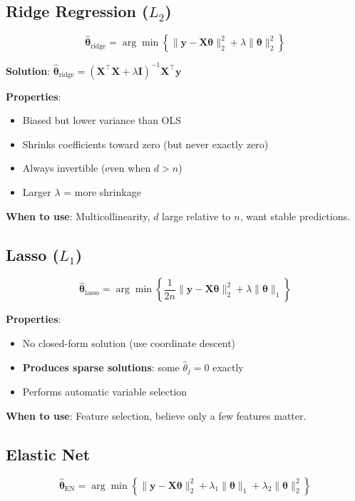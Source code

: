 \documentclass[main.tex]{subfiles}
\begin{document}
\subsection{Ridge Regression ($L_2$)}

$$\hat{\boldsymbol{\theta}}_{\text{ridge}} = \arg\min \left\{ \|\mathbf{y} - \mathbf{X}\boldsymbol{\theta}\|_2^2 + \lambda\|\boldsymbol{\theta}\|_2^2 \right\}$$

\textbf{Solution}: $\hat{\boldsymbol{\theta}}_{\text{ridge}} = (\mathbf{X}^\top\mathbf{X} + \lambda\mathbf{I})^{-1}\mathbf{X}^\top\mathbf{y}$

\textbf{Properties}:
\begin{itemize}
    \item Biased but lower variance than OLS
    \item Shrinks coefficients toward zero (but never exactly zero)
    \item Always invertible (even when $d > n$)
    \item Larger $\lambda$ = more shrinkage
\end{itemize}

\textbf{When to use}: Multicollinearity, $d$ large relative to $n$, want stable predictions.

\subsection{Lasso ($L_1$)}

$$\hat{\boldsymbol{\theta}}_{\text{lasso}} = \arg\min \left\{ \frac{1}{2n}\|\mathbf{y} - \mathbf{X}\boldsymbol{\theta}\|_2^2 + \lambda\|\boldsymbol{\theta}\|_1 \right\}$$

\textbf{Properties}:
\begin{itemize}
    \item No closed-form solution (use coordinate descent)
    \item \textbf{Produces sparse solutions}: some $\hat{\theta}_j = 0$ exactly
    \item Performs automatic variable selection
\end{itemize}

\textbf{When to use}: Feature selection, believe only a few features matter.

\subsection{Elastic Net}

$$\hat{\boldsymbol{\theta}}_{\text{EN}} = \arg\min \left\{ \|\mathbf{y} - \mathbf{X}\boldsymbol{\theta}\|_2^2 + \lambda_1\|\boldsymbol{\theta}\|_1 + \lambda_2\|\boldsymbol{\theta}\|_2^2 \right\}$$
\end{document}
